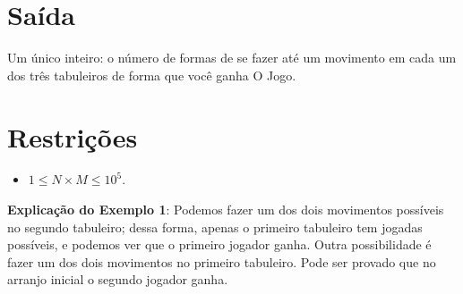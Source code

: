 \section*{Saída}

Um único inteiro: o número de formas de se fazer até um movimento em cada um dos três tabuleiros de forma que você ganha O Jogo.


\section*{Restrições}

\begin{itemize}
\item $1 \leq N\times M \leq 10^5$.
\end{itemize}

\exemplo

\bigskip
\textbf{Explicação do Exemplo 1}: Podemos fazer um dos dois movimentos possíveis no segundo tabuleiro; dessa forma, apenas o primeiro tabuleiro tem jogadas possíveis, e podemos ver que o primeiro jogador ganha. Outra possibilidade é fazer um dos dois movimentos no primeiro tabuleiro. Pode ser provado que no arranjo inicial o segundo jogador ganha.


